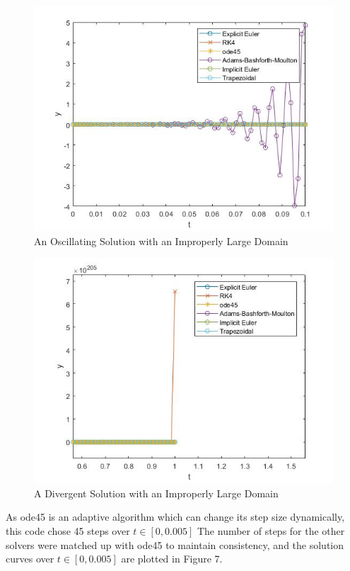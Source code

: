 \documentclass[11pt]{article}
\begin{document}
\begin{figure} [h]
\centering
        \includegraphics[totalheight=10cm]{figure3.jpg}
    \caption{An Oscillating Solution with an Improperly Large Domain}
    \label{figure5}
\end{figure}

\newpage

\begin{figure} [!h]
\centering
        \includegraphics[totalheight=7cm]{divergence.jpg}
    \caption{A Divergent Solution with an Improperly Large Domain}
    \label{figure6}
\end{figure}

As ode45 is an adaptive algorithm which can change its step size dynamically,
this code chose 45 steps over $t\in [0,0.005]$ The number of steps for the other 
solvers were matched up with ode45 to maintain consistency, and the solution curves 
over $t\in [0,0.005]$ are plotted in Figure 7.
\end{document}
